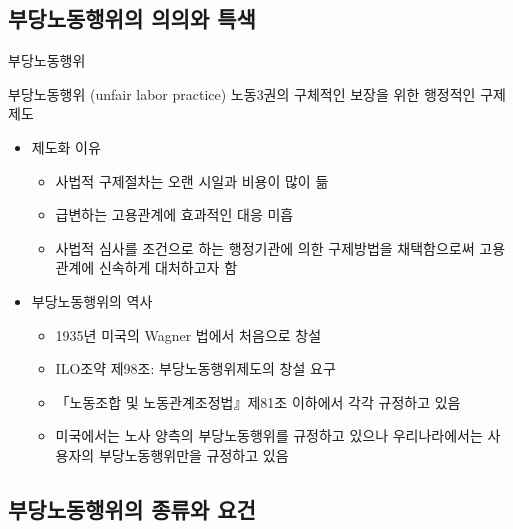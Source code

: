 \documentclass[aspectratio=169,xcolor=dvipsnames,handout]{beamer}
\begin{document}
\subsection{부당노동행위의 의의와 특색}%

\begin{frame}[allowframebreaks]{부당노동행위}
    \begin{block}{부당노동행위 (unfair labor practice)}
        노동3권의 구체적인 보장을 위한 행정적인 구제제도
    \end{block}
    \begin{itemize}[<+->]
        \item 제도화 이유
        \begin{itemize}[<+->]
            \item 사법적 구제절차는 오랜 시일과 비용이 많이 듦
            \item 급변하는 고용관계에 효과적인 대응 미흡
            \item 사법적 심사를 조건으로 하는 행정기관에 의한 구제방법을 채택함으로써 고용관계에 신속하게 대처하고자 함
        \end{itemize}
    \framebreak\relax
    \item 부당노동행위의 역사
        \begin{itemize}[<+->]
            \item 1935년 미국의 Wagner 법에서 처음으로 창설
            \item ILO조약 제98조: 부당노동행위제도의 창설 요구
            \item 「노동조합 및 노동관계조정법』제81조 이하에서 각각 규정하고 있음
            \item 미국에서는 노사 양측의 부당노동행위를 규정하고 있으나 우리나라에서는 사용자의 부당노동행위만을 규정하고 있음
        \end{itemize}
    \end{itemize}
\end{frame}

\subsection{부당노동행위의 종류와 요건}%
\end{document}
